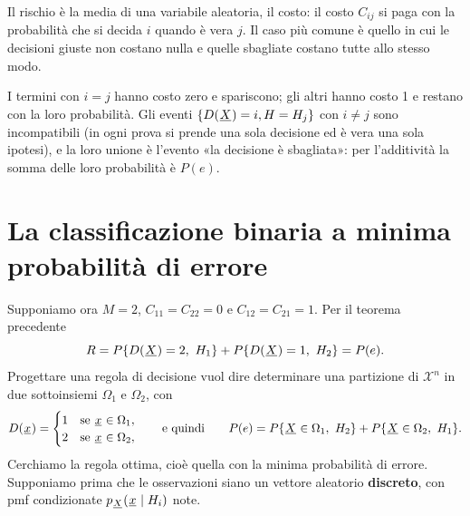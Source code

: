 
Il rischio è la media di una variabile aleatoria, il costo: il costo $C_{ij}$ si paga con la probabilità che si decida
$i$ quando è vera $j$. Il caso più comune è quello in cui le decisioni giuste non costano nulla e quelle sbagliate
costano tutte allo stesso modo.


\begin{dimostrazione}
\passo{} I termini con $i = j$ hanno costo zero e spariscono; gli altri hanno costo 1 e restano con la loro
probabilità. Gli eventi $\{D({\mkern1mu\underline{X}\mkern1mu}) = i, H = H_j\}$ con $i \neq j$ sono incompatibili (in ogni prova si prende una
sola decisione ed è vera una sola ipotesi), e la loro unione è l'evento «la decisione è sbagliata»: per l'additività la
somma delle loro probabilità è $P(e)$.
\end{dimostrazione}

\section{La classificazione binaria a minima probabilità di errore}

Supponiamo ora $M = 2$, $C_{11} = C_{22} = 0$ e $C_{12} = C_{21} = 1$. Per il teorema precedente
\[ R = P\{D({\mkern1mu\underline{X}\mkern1mu}) = 2,\ H_1\} + P\{D({\mkern1mu\underline{X}\mkern1mu}) = 1,\ H_2\} = P(e) . \]
Progettare una regola di decisione vuol dire determinare una partizione di $\mathcal{X}^n$ in due sottoinsiemi
$\Omega_1$ e $\Omega_2$, con
\[ D({\mkern1mu\underline{x}\mkern1mu}) = \begin{cases} 1 & \text{se } {\mkern1mu\underline{x}\mkern1mu} \in \Omega_1 , \\ 2 & \text{se } {\mkern1mu\underline{x}\mkern1mu} \in \Omega_2 ,
   \end{cases} \qquad\text{e quindi}\qquad P(e) = P\{{\mkern1mu\underline{X}\mkern1mu} \in \Omega_1,\ H_2\} + P\{{\mkern1mu\underline{X}\mkern1mu} \in \Omega_2,\ H_1\} . \]
Cerchiamo la regola ottima, cioè quella con la minima probabilità di errore. Supponiamo prima che le osservazioni siano
un vettore aleatorio \textbf{discreto}, con pmf condizionate $p_{{\mkern1mu\underline{X}\mkern1mu}}({\mkern1mu\underline{x}\mkern1mu} \mid H_i)$ note.

